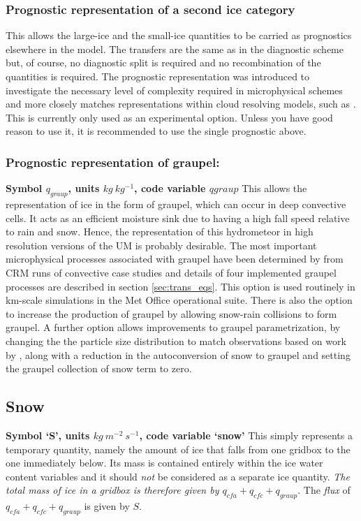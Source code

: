 \documentclass{UMDP_article}
\begin{document}
\subsubsection{Prognostic representation of a second ice category}
This allows the large-ice and the small-ice 
quantities to be carried as prognostics elsewhere in the model. The transfers are
the same as in the diagnostic scheme but, of course, no diagnostic split 
is required and no recombination of the quantities is required. The prognostic 
representation was introduced to investigate the necessary level of complexity 
required in microphysical schemes and more closely matches representations 
within cloud resolving models, such as \cite{Swann:1996}. This is currently
only used as an experimental option. Unless you have good reason to use it,
it is recommended to use the single prognostic above. 

\subsubsection{Prognostic representation of graupel:}
\textbf{Symbol $q_{graup}$, units $kg~kg^{-1}$, code variable $qgraup$}
This allows the representation of ice in the form of graupel, which can occur
in deep convective cells. It acts as an efficient moisture sink due to having
a high fall speed relative to rain and snow. Hence, the representation of this 
hydrometeor in high resolution versions of the UM is probably desirable. 
The most important microphysical processes associated with graupel have 
been determined by \cite{Forbes:Halliwell:2003} from CRM runs of convective case
studies and details of four implemented graupel processes are described in 
section \ref{sec:trans_eqs}. This option is used routinely in km-scale simulations
in the Met Office operational suite. There is also the option to increase the
production of graupel by allowing snow-rain collisions to form graupel. A further
option allows improvements to graupel parametrization, by changing the the particle size 
distribution to match observations based on work by \cite{Field:etal:2019}, along with a
reduction in the autoconversion of snow to graupel and setting the graupel collection
of snow term to zero.

\subsection{Snow}
\label{sec:snowdes}
\textbf{Symbol `S', units $kg~m^{-2}~s^{-1}$, code variable `snow'}
This simply represents a temporary quantity, namely the amount of ice that 
falls from one gridbox to the one immediately below. Its mass is contained 
entirely within the ice water content variables and it should \textit{not} be
considered as a separate ice quantity. 
\textit{The total mass of ice in a gridbox is therefore given by 
$q_{cfa} + q_{cfc} +q_{graup}$}.  The \textit{flux} of 
$q_{cfa} + q_{cfc}+ q_{graup}$ is given by $S$. 
\end{document}
